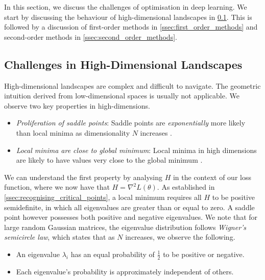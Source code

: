 In this section, we discuss the challenges of optimisation in deep learning. We start by discussing the behaviour of high-dimensional landscapes in \cref{ssec:dl_challenges}. This is followed by a discussion of first-order methods in \cref{ssec:first_order_methods} and second-order methods in \cref{ssec:second_order_methods}.

\subsection{Challenges in High-Dimensional Landscapes}
\label{ssec:dl_challenges}

High-dimensional landscapes are complex and difficult to navigate. The geometric intuition derived from low-dimensional spaces is usually not applicable. We observe two key properties in high-dimensions.
\begin{itemize}
    \item \textit{Proliferation of saddle points}: Saddle points are \textit{exponentially} more likely than local minima as dimensionality $N$ increases \citep{dauphin2014sfn}.
    \item \textit{Local minima are close to global minimum}: Local minima in high dimensions are likely to have values very close to the global minimum \citep{dauphin2014sfn,choromanska2015loss}.
\end{itemize}

We can understand the first property by analysing $H$ in the context of our loss function, where we now have that $H = \nabla^2 L(\theta)$. As established in \cref{ssec:recognising_critical_points}, a local minimum requires all $H$ to be positive semidefinite, in which all eigenvalues are greater than or equal to zero. A saddle point however possesses both positive and negative eigenvalues. We note that for large random Gaussian matrices, the eigenvalue distribution follows \textit{Wigner's semicircle law}, which states that as $N$ increases, we observe the following.
\begin{itemize}
    \item An eigenvalue $\lambda_i$ has an equal probability of $\frac{1}{2}$ to be positive or negative. 
    \item Each eigenvalue's probability is approximately independent of others.
\end{itemize}

